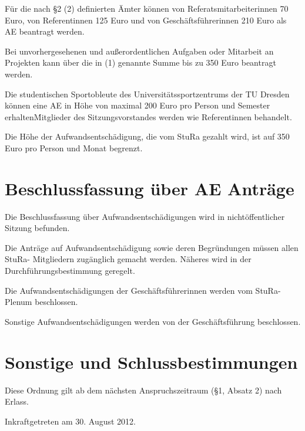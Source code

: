 \begin{multicols}{2}
\Abs \Satz Für die nach §2 (2) definierten Ämter können von Referatsmitarbeiterinnen 70 Euro, von Referentinnen 125 Euro und von Geschäftsführerinnen 210 Euro als AE beantragt werden.

\Abs \Satz Bei unvorhergesehenen und außerordentlichen Aufgaben oder Mitarbeit an Projekten kann über die in (1) genannte Summe bis zu 350 Euro beantragt werden.

\Abs \Satz  Die studentischen Sportobleute des Universitätssportzentrums der TU Dresden können eine AE in Höhe von maximal 200 Euro pro Person und Semester erhalten\. Mitglieder des Sitzungsvorstandes werden wie Referentinnen behandelt.

\Abs \Satz Die Höhe der Aufwandsentschädigung, die vom StuRa gezahlt wird, ist auf 350 Euro pro Person und Monat begrenzt. 

\section{Beschlussfassung über AE Anträge}

\Abs \Satz Die Beschlussfassung über Aufwandsentschädigungen wird in nichtöffentlicher Sitzung befunden.

\Abs \Satz Die Anträge auf Aufwandsentschädigung sowie deren Begründungen müssen allen StuRa- Mitgliedern zugänglich gemacht werden. Näheres wird in der Durchführungsbestimmung geregelt.

\Abs \Satz Die Aufwandsentschädigungen der Geschäftsführerinnen werden vom StuRa-Plenum beschlossen.

\Abs \Satz Sonstige Aufwandsentschädigungen werden von der Geschäftsführung beschlossen.


\section{Sonstige und Schlussbestimmungen}

\Abs \Satz Diese Ordnung gilt ab dem nächsten Anspruchszeitraum (§1, Absatz 2) nach Erlass.

\end{multicols}

\nopagebreak
\vspace{1cm}

\footnotesize
Inkraftgetreten am 30. August 2012.\\


